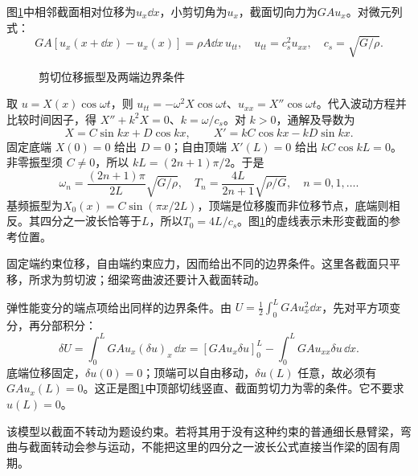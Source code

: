 \begin{solution}
图\ref{fig:hw7-1-s}中相邻截面相对位移为$u_x\dd x$，小剪切角为$u_x$，截面切向力为$GAu_x$。对微元列式：
\[
 GA[u_x(x+\dd x)-u_x(x)]=\rho A\dd x\,u_{tt},
 \quad u_{tt}=c_s^2u_{xx},\quad c_s=\sqrt{G/\rho}.
\]

\begin{figure}[H]\centering
{}
\caption{剪切位移振型及两端边界条件}\label{fig:hw7-1-s}
\end{figure}

取 $u=X(x)\cos\omega t$，则 $u_{tt}=-\omega^2X\cos\omega t$、$u_{xx}=X''\cos\omega t$。代入波动方程并比较时间因子，得 $X''+k^2X=0$、$k=\omega/c_s$。对 $k>0$，通解及导数为
\[
X=C\sin kx+D\cos kx,\qquad X'=kC\cos kx-kD\sin kx.
\]
固定底端 $X(0)=0$ 给出 $D=0$；自由顶端 $X'(L)=0$ 给出 $kC\cos kL=0$。非零振型须 $C\ne0$，所以 $kL=(2n+1)\pi/2$。于是
\[
 \boxed{\omega_n=\frac{(2n+1)\pi}{2L}\sqrt{G/\rho},\quad
 T_n=\frac{4L}{2n+1}\sqrt{\rho/G},\quad n=0,1,\ldots}.
\]
基频振型为$X_0(x)=C\sin(\pi x/2L)$，顶端是位移腹而非位移节点，底端则相反。其四分之一波长恰等于$L$，所以$T_0=4L/c_s$。图\ref{fig:hw7-1-s}的虚线表示未形变截面的参考位置。

固定端约束位移，自由端约束应力，因而给出不同的边界条件。这里各截面只平移，所求为剪切波；细梁弯曲波还要计入截面转动。


弹性能变分的端点项给出同样的边界条件。由 $U=\tfrac12\int_0^LGAu_x^2\dd x$，先对平方项变分，再分部积分：
\[
\delta U=\int_0^LGAu_x(\delta u)_x\,\dd x
=[GAu_x\delta u]_0^L-\int_0^LGAu_{xx}\delta u\,\dd x.
\]
底端位移固定，$\delta u(0)=0$；顶端可以自由移动，$\delta u(L)$ 任意，故必须有 $GAu_x(L)=0$。这正是图\ref{fig:hw7-1-s}中顶部切线竖直、截面剪切力为零的条件。它不要求 $u(L)=0$。

该模型以截面不转动为题设约束。若将其用于没有这种约束的普通细长悬臂梁，弯曲与截面转动会参与运动，不能把这里的四分之一波长公式直接当作梁的固有周期。

\end{solution}



